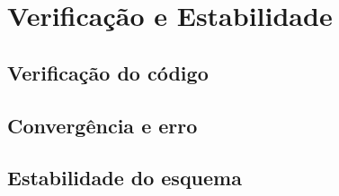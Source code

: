 \chapter{Verificação e Estabilidade}
\label{chapter:cap8}
\section{\textbf{Verificação do código}}
\section{\textbf{Convergência e erro}}
\section{\textbf{Estabilidade do esquema}}